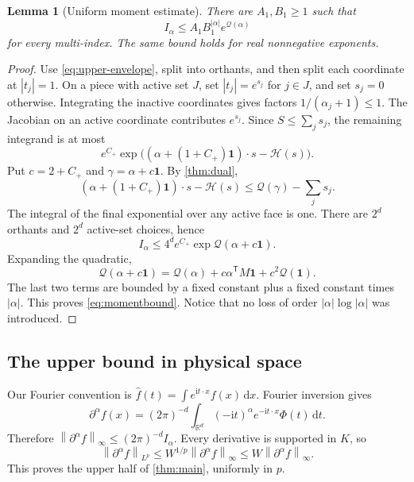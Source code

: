 \documentclass[11pt,a4paper]{article}
\numberwithin{equation}{section}
\newtheorem{lemma}[theorem]{Lemma}
\theoremstyle{definition}
\theoremstyle{remark}\newtheorem{remark}[theorem]{Remark}
\newcommand{\R}{\mathbb R}\newcommand{\N}{\mathbb N}
\newcommand{\dd}{\,\mathrm d}
\newcommand{\ii}{\mathrm i}
\newcommand{\one}{\mathbf 1}
\newcommand{\He}{\mathcal H}
\newcommand{\Qf}{\mathcal Q}
\newcommand{\norm}[1]{\left\lVert #1\right\rVert}
\begin{document}
\begin{lemma}[Uniform moment estimate]
\label{lem:moments}
There are $A_1,B_1\ge1$ such that
\begin{equation}
 I_\alpha\le A_1B_1^{|\alpha|}e^{\Qf(\alpha)}
 \label{eq:momentbound}
\end{equation}
for every multi-index. The same bound holds for real nonnegative exponents.
\end{lemma}
\begin{proof}
Use \eqref{eq:upper-envelope}, split into orthants, and then split each
coordinate at $|t_j|=1$. On a piece with active set $J$, set $|t_j|=e^{s_j}$
for $j\in J$, and set $s_j=0$ otherwise. Integrating the inactive coordinates
gives factors $1/(\alpha_j+1)\le1$. The Jacobian on an active coordinate
contributes $e^{s_j}$. Since $S\le\sum_js_j$, the remaining integrand is at
most
\[
 e^{C_+}\exp\bigl((\alpha+(1+C_+)\one)\cdot s-\He(s)\bigr).
\]
Put $c=2+C_+$ and $\gamma=\alpha+c\one$. By \cref{thm:dual},
\[
 (\alpha+(1+C_+)\one)\cdot s-\He(s)
 \le\Qf(\gamma)-\sum_js_j.
\]
The integral of the final exponential over any active face is one. There
are $2^d$ orthants and $2^d$ active-set choices, hence
\begin{equation}
 I_\alpha\le4^de^{C_+}\exp\Qf(\alpha+c\one).
 \label{eq:explicitmoment}
\end{equation}
Expanding the quadratic,
\[
 \Qf(\alpha+c\one)=\Qf(\alpha)+c\alpha^{\mathsf T}M\one+c^2\Qf(\one).
\]
The last two terms are bounded by a fixed constant plus a fixed constant
times $|\alpha|$. This proves \eqref{eq:momentbound}. Notice that no loss of
order $|\alpha|\log|\alpha|$ was introduced.
\end{proof}

\subsection{The upper bound in physical space}

Our Fourier convention is $\widehat f(t)=\int e^{\ii t\cdot x}f(x)\dd x$.
Fourier inversion gives
\begin{equation}
 \partial^\alpha f(x)=(2\pi)^{-d}\int_{\R^d}
            (-\ii t)^\alpha e^{-\ii t\cdot x}\Phi(t)\dd t.
 \label{eq:inversion}
\end{equation}
Therefore $\norm{\partial^\alpha f}_\infty\le(2\pi)^{-d}I_\alpha$.
Every derivative is supported in $K$, so
\begin{equation}
 \norm{\partial^\alpha f}_{L^p}\le W^{1/p}
                   \norm{\partial^\alpha f}_\infty
             \le W\norm{\partial^\alpha f}_\infty.
 \label{eq:pupper}
\end{equation}
This proves the upper half of \cref{thm:main}, uniformly in $p$.
\end{document}
